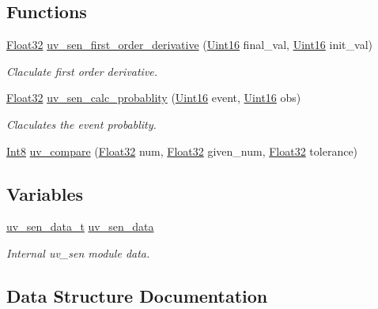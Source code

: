 \subsection*{Functions}
\begin{DoxyCompactItemize}
\item 
\hyperlink{a00072_a87d38f886e617ced2698fc55afa07637}{Float32} \hyperlink{a00035_ae4600a772ff6ca64c4e169e726623058}{uv\+\_\+sen\+\_\+first\+\_\+order\+\_\+derivative} (\hyperlink{a00072_a59a9f6be4562c327cbfb4f7e8e18f08b}{Uint16} final\+\_\+val, \hyperlink{a00072_a59a9f6be4562c327cbfb4f7e8e18f08b}{Uint16} init\+\_\+val)
\begin{DoxyCompactList}\small\item\em Claculate first order derivative. \end{DoxyCompactList}\item 
\hyperlink{a00072_a87d38f886e617ced2698fc55afa07637}{Float32} \hyperlink{a00035_a252304c3c6703a4e94f39c17d0be256b}{uv\+\_\+sen\+\_\+calc\+\_\+probablity} (\hyperlink{a00072_a59a9f6be4562c327cbfb4f7e8e18f08b}{Uint16} event, \hyperlink{a00072_a59a9f6be4562c327cbfb4f7e8e18f08b}{Uint16} obs)
\begin{DoxyCompactList}\small\item\em Claculates the event probablity. \end{DoxyCompactList}\item 
\hyperlink{a00072_a7e31ca7716b8d85dd473450a5c5e5a97}{Int8} \hyperlink{a00035_a1bf033abd3b69751cc1da740ec06f459}{uv\+\_\+compare} (\hyperlink{a00072_a87d38f886e617ced2698fc55afa07637}{Float32} num, \hyperlink{a00072_a87d38f886e617ced2698fc55afa07637}{Float32} given\+\_\+num, \hyperlink{a00072_a87d38f886e617ced2698fc55afa07637}{Float32} tolerance)
\end{DoxyCompactItemize}
\subsection*{Variables}
\begin{DoxyCompactItemize}
\item 
\hyperlink{a00035_d9/d30/a00848}{uv\+\_\+sen\+\_\+data\+\_\+t} \hyperlink{a00035_adb4cffe9b88704fe686a94fe9996fa52}{uv\+\_\+sen\+\_\+data}
\begin{DoxyCompactList}\small\item\em Internal uv\+\_\+sen module data. \end{DoxyCompactList}\end{DoxyCompactItemize}


\subsection{Data Structure Documentation}
\label{d9/d30/a00848}
\hypertarget{a00035_d9/d30/a00848}{}

